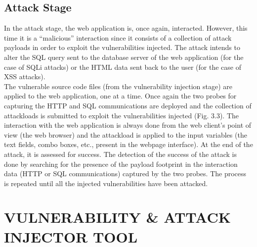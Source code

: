 \subsection{Attack Stage}
In the attack stage, the web application is, once again, interacted. However, this time it is a ``malicious'' interaction since it consists of a collection of attack payloads in order to
exploit the vulnerabilities injected. The attack intends to
alter the SQL query sent to the database server of the web
application (for the case of SQLi attacks) or the HTML data
sent back to the user (for the case of XSS attacks).\\
\newline
The vulnerable source code files (from the vulnerability injection stage) are applied to the web application,
one at a time. Once again the two probes for capturing
the HTTP and SQL communications are deployed and
the collection of attackloads is submitted to exploit the vulnerabilities injected (Fig. 3.3). The interaction with the
web application is always done from the web client’s
point of view (the web browser) and the attackload is
applied to the input variables (the text fields, combo
boxes, etc., present in the webpage interface). At the end
of the attack, it is assessed for success. The
detection of the success of the attack is done by searching
for the presence of the payload footprint in the interaction
data (HTTP or SQL communications) captured by the two
probes. The process is repeated until all the injected vulnerabilities have been attacked.\\
\newline

\pagebreak


\section{VULNERABILITY \& ATTACK INJECTOR TOOL}

